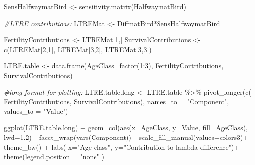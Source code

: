 \documentclass[
]{book}
\newenvironment{Shaded}{\begin{snugshade}}{\end{snugshade}}
\newcommand{\AttributeTok}[1]{\textcolor[rgb]{0.77,0.63,0.00}{#1}}
\newcommand{\CommentTok}[1]{\textcolor[rgb]{0.56,0.35,0.01}{\textit{#1}}}
\newcommand{\DecValTok}[1]{\textcolor[rgb]{0.00,0.00,0.81}{#1}}
\newcommand{\FloatTok}[1]{\textcolor[rgb]{0.00,0.00,0.81}{#1}}
\newcommand{\FunctionTok}[1]{\textcolor[rgb]{0.00,0.00,0.00}{#1}}
\newcommand{\NormalTok}[1]{#1}
\newcommand{\OtherTok}[1]{\textcolor[rgb]{0.56,0.35,0.01}{#1}}
\newcommand{\SpecialCharTok}[1]{\textcolor[rgb]{0.00,0.00,0.00}{#1}}
\newcommand{\StringTok}[1]{\textcolor[rgb]{0.31,0.60,0.02}{#1}}
\begin{document}
\begin{Shaded}
\begin{Highlighting}[]
\NormalTok{SensHalfwaymatBird }\OtherTok{\textless{}{-}} \FunctionTok{sensitivity.matrix}\NormalTok{(HalfwaymatBird)}
 
\CommentTok{\#LTRE contributions:}
\NormalTok{LTREMat }\OtherTok{\textless{}{-}}\NormalTok{ DiffmatBird}\SpecialCharTok{*}\NormalTok{SensHalfwaymatBird}

\NormalTok{FertilityContributions }\OtherTok{\textless{}{-}}\NormalTok{ LTREMat[}\DecValTok{1}\NormalTok{,]}
\NormalTok{SurvivalContributions }\OtherTok{\textless{}{-}} \FunctionTok{c}\NormalTok{(LTREMat[}\DecValTok{2}\NormalTok{,}\DecValTok{1}\NormalTok{], }
\NormalTok{                           LTREMat[}\DecValTok{3}\NormalTok{,}\DecValTok{2}\NormalTok{], }
\NormalTok{                           LTREMat[}\DecValTok{3}\NormalTok{,}\DecValTok{3}\NormalTok{])}

\NormalTok{LTRE.table }\OtherTok{\textless{}{-}} \FunctionTok{data.frame}\NormalTok{(}\AttributeTok{AgeClass=}\FunctionTok{factor}\NormalTok{(}\DecValTok{1}\SpecialCharTok{:}\DecValTok{3}\NormalTok{), }
\NormalTok{                         FertilityContributions, }
\NormalTok{                         SurvivalContributions)}

\CommentTok{\#long format for plotting:}
\NormalTok{LTRE.table.long }\OtherTok{\textless{}{-}}\NormalTok{ LTRE.table }\SpecialCharTok{\%\textgreater{}\%} 
  \FunctionTok{pivot\_longer}\NormalTok{(}\FunctionTok{c}\NormalTok{( FertilityContributions, }
\NormalTok{                  SurvivalContributions),}
               \AttributeTok{names\_to =} \StringTok{"Component"}\NormalTok{, }
               \AttributeTok{values\_to =} \StringTok{"Value"}\NormalTok{)}
 
\FunctionTok{ggplot}\NormalTok{(LTRE.table.long) }\SpecialCharTok{+} 
  \FunctionTok{geom\_col}\NormalTok{(}\FunctionTok{aes}\NormalTok{(}\AttributeTok{x=}\NormalTok{AgeClass, }\AttributeTok{y=}\NormalTok{Value, }\AttributeTok{fill=}\NormalTok{AgeClass), }\AttributeTok{lwd=}\FloatTok{1.2}\NormalTok{)}\SpecialCharTok{+}
  \FunctionTok{facet\_wrap}\NormalTok{(}\FunctionTok{vars}\NormalTok{(Component))}\SpecialCharTok{+}
  \FunctionTok{scale\_fill\_manual}\NormalTok{(}\AttributeTok{values=}\NormalTok{colors3)}\SpecialCharTok{+}
  \FunctionTok{theme\_bw}\NormalTok{() }\SpecialCharTok{+}
  \FunctionTok{labs}\NormalTok{( }\AttributeTok{x=}\StringTok{"Age class"}\NormalTok{, }\AttributeTok{y=}\StringTok{"Contribution to lambda difference"}\NormalTok{)}\SpecialCharTok{+}
    \FunctionTok{theme}\NormalTok{(}\AttributeTok{legend.position =} \StringTok{"none"}\NormalTok{ ) }
\end{Highlighting}
\end{Shaded}
\end{document}

